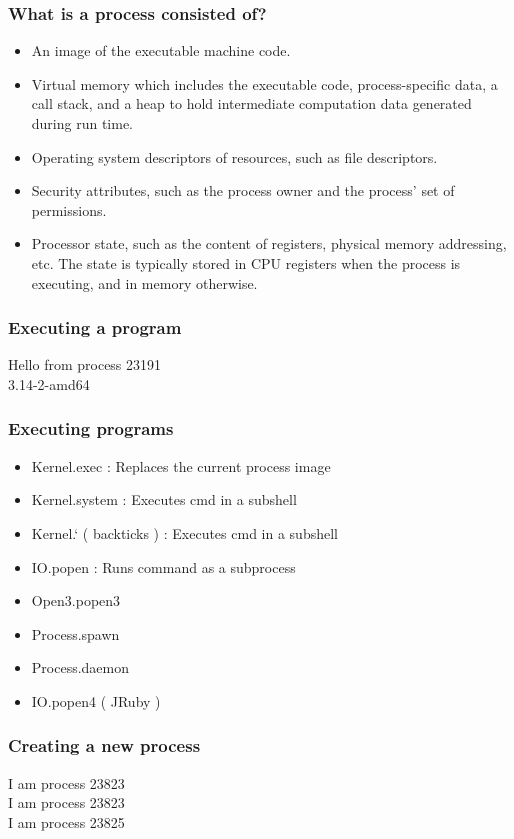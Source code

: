 \documentclass{beamer}
\begin{document}
\begin{frame}
  \frametitle{What is a process consisted of?}

  \begin{itemize}
    \pause \item An image of the executable machine code.
    \pause \item Virtual memory which includes the executable code, process-specific data, a call stack, and a heap to hold intermediate computation data generated during run time.
    \pause \item Operating system descriptors of resources, such as file descriptors.
    \pause \item Security attributes, such as the process owner and the process' set of permissions.
    \pause \item Processor state, such as the content of registers, physical memory addressing, etc. The state is typically stored in CPU registers when the process is executing, and in memory otherwise.
  \end{itemize}
\end{frame}

\begin{frame}
  \frametitle{Executing a program}

  

  \pause
  Hello from process 23191 \\
  3.14-2-amd64
\end{frame}

\begin{frame}
  \frametitle{Executing programs}

  \begin{itemize}
    \item Kernel.exec \pause: Replaces the current process image
    \item Kernel.system \pause: Executes cmd in a subshell
    \item Kernel.` ( backticks ) \pause: Executes cmd in a subshell
    \item IO.popen \pause: Runs command as a subprocess
    \item Open3.popen3
    \item Process.spawn
    \item Process.daemon
    \item IO.popen4 ( JRuby )
  \end{itemize}
\end{frame}

\begin{frame}
  \frametitle{Creating a new process}

  

  \pause
  I am process 23823 \\
  I am process 23823 \\
  I am process 23825
\end{frame}
\end{document}
